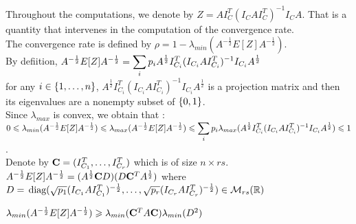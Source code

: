 Throughout the computations, we denote by $Z = A I_{C}^{T} (I_{C} A I_{C}^{T})^{-1} I_{C} A$. That is a quantity that intervenes in the computation of the convergence rate.\\

The convergence rate is defined by $\rho = 1 - \lambda_{min}(A^{-\frac12}E[Z]A^{-\frac12}  )$.\\

By defiition, $A^{-\frac12}E[Z]A^{-\frac12} = \dsp\sum\limits_{i} p_{i} A^{\frac 12} I_{C_{i}}^{T} (I_{C_{i}}  A  I_{C_{i}}^{T})^{-1} I_{C_{i}} A^{\frac 12}$ \\

for any $i \in \acco{1,\dots,n}$, $A^{\frac 12} I_{C_{i}}^{T} (I_{C_{i}}  A  I_{C_{i}}^{T})^{-1} I_{C_{i}} A^{\frac 12}$ is a projection matrix and then its eigenvalues are a nonempty subset of $\acco{0,1}$.\\

Since $\lambda_{max}$ is convex, we obtain that :\\

$0 \leq \lambda_{min}(A^{-\frac12}E[Z]A^{-\frac12}) \leq  \lambda_{max}(A^{-\frac12}E[Z]A^{-\frac12}) \leq \dsp\sum\limits_{i} p_{i} \lambda_{max}(A^{\frac 12} I_{C_{i}}^{T} (I_{C_{i}}  A  I_{C_{i}}^{T})^{-1} I_{C_{i}} A^{\frac 12}) \leq 1$.\\

Denote by $\bold{C} = (I_{C_{1}}^{T},\dots,I_{C_{r}}^{T})$ which is of size $ n \times r s$.\\

$A^{-\frac12}E[Z]A^{-\frac12} = (A^{\frac 12} \bold{C} D)(D \bold{C}^{T} A^{\frac 12})$ where \\$D =  \,\text{diag}(\sqrt{p_{1}} (I_{C_{1}}A I_{C_{1}}^{T})^{-\frac 12},\dots, \sqrt{p_{r}}(I_{C_{r}} A I_{C_{r}}^{T})^{-\frac 12}) \in \M_{r s}(\R)$
 
 
\pr 

$\lambda_{min}(A^{-\frac12}E[Z]A^{-\frac12} ) \geq \lambda_{min}(\bold{C}^{T}A \bold{C} ) \lambda_{min}(D^{2})$

